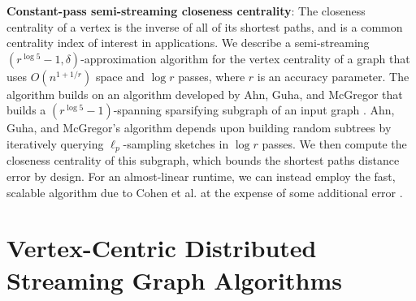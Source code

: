 \documentclass{report}
\begin{document}
\noindent
\textbf{Constant-pass semi-streaming closeness centrality}:
The closeness centrality of a vertex is the inverse of all of its shortest paths, and is a common centrality index of interest in applications.
We describe a semi-streaming $(r^{\log 5} -1, \delta)$-approximation algorithm for the vertex centrality of a graph that uses $O(n^{1+1/r})$ space and $\log r$ passes, where $r$ is an accuracy parameter.
The algorithm builds on an algorithm developed by Ahn, Guha, and McGregor that builds a $(r^{\log 5} -1)$-spanning sparsifying subgraph of an input graph \cite{ahn2012graph}.
Ahn, Guha, and McGregor's algorithm depends upon building random subtrees by iteratively querying $\ell_p$-sampling sketches in $\log r$ passes.
We then compute the closeness centrality of this subgraph, which bounds the shortest paths distance error by design.
For an almost-linear runtime, we can instead employ the fast, scalable algorithm due to Cohen et al. at the expense of some additional error \cite{cohen2014computing}. 










\section{Vertex-Centric Distributed Streaming Graph Algorithms} \label{intro:sec:distributed_streaming}
\end{document}
